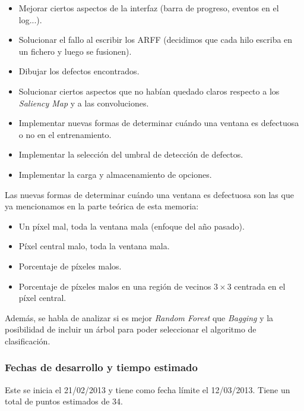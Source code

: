 \begin{itemize}
\item Mejorar ciertos aspectos de la interfaz (barra de progreso, eventos en el log...).
\item Solucionar el fallo al escribir los ARFF (decidimos que cada hilo escriba en un fichero y luego se fusionen).
\item Dibujar los defectos encontrados.
\item Solucionar ciertos aspectos que no habían quedado claros respecto a los \textit{Saliency Map} y a las convoluciones.
\item Implementar nuevas formas de determinar cuándo una ventana es defectuosa o no en el entrenamiento.
\item Implementar la selección del umbral de detección de defectos.
\item Implementar la carga y almacenamiento de opciones.
\end{itemize}

Las nuevas formas de determinar cuándo una ventana es defectuosa son las que ya mencionamos en la parte teórica de esta memoria:

\begin{itemize}
\item Un píxel mal, toda la ventana mala (enfoque del año pasado).
\item Píxel central malo, toda la ventana mala.
\item Porcentaje de píxeles malos.
\item Porcentaje de píxeles malos en una región de vecinos $3\times3$ centrada en el píxel central.
\end{itemize}

Además, se habla de analizar si es mejor \textit{Random Forest} que \textit{Bagging} y la posibilidad de incluir un árbol para poder seleccionar el algoritmo de clasificación.

\subsubsection*{Fechas de desarrollo y tiempo estimado}
Este \sprint{} se inicia el 21/02/2013 y tiene como fecha límite el 12/03/2013. Tiene un total de puntos estimados de 34.

